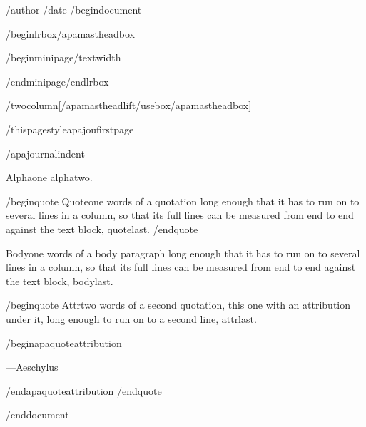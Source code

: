 /author{}
/date{}
/begin{document}


/begin{lrbox}{/apamastheadbox}%

/begin{minipage}{/textwidth}

/end{minipage}/end{lrbox}

/twocolumn[/apamastheadlift/usebox{/apamastheadbox}]

/thispagestyle{apajoufirstpage}

/apajournalindent

Alphaone alphatwo.

/begin{quote}
Quoteone words of a quotation long enough that it has to run on to
several lines in a column, so that its full lines can be measured from
end to end against the text block, quotelast.
/end{quote}

Bodyone words of a body paragraph long enough that it has to run on to
several lines in a column, so that its full lines can be measured from
end to end against the text block, bodylast.

/begin{quote}
Attrtwo words of a second quotation, this one with an attribution under
it, long enough to run on to a second line, attrlast.

/begin{apaquoteattribution}

---Aeschylus

/end{apaquoteattribution}
/end{quote}




/end{document}
